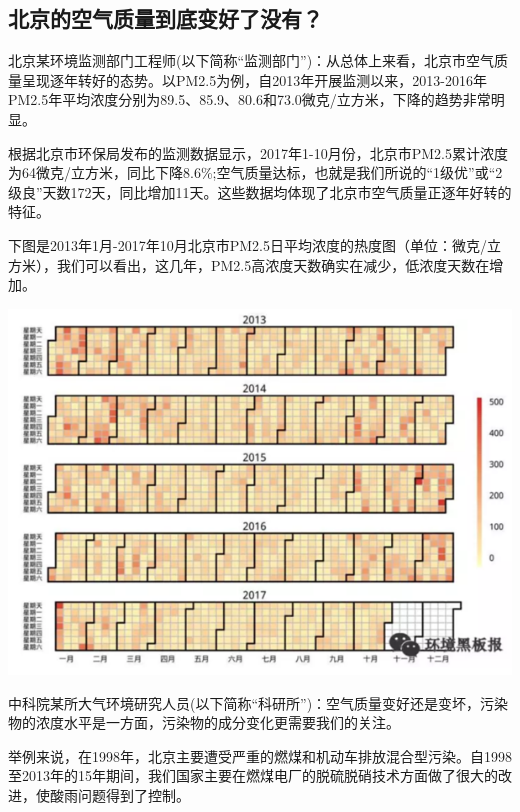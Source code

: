 \documentclass[
]{book}
\begin{document}
\hypertarget{ux5317ux4eacux7684ux7a7aux6c14ux8d28ux91cfux5230ux5e95ux53d8ux597dux4e86ux6ca1ux6709}{%
\subsection{北京的空气质量到底变好了没有？}\label{ux5317ux4eacux7684ux7a7aux6c14ux8d28ux91cfux5230ux5e95ux53d8ux597dux4e86ux6ca1ux6709}}

北京某环境监测部门工程师(以下简称``监测部门'')：从总体上来看，北京市空气质量呈现逐年转好的态势。以PM2.5为例，自2013年开展监测以来，2013-2016年PM2.5年平均浓度分别为89.5、85.9、80.6和73.0微克/立方米，下降的趋势非常明显。

根据北京市环保局发布的监测数据显示，2017年1-10月份，北京市PM2.5累计浓度为64微克/立方米，同比下降8.6\%;空气质量达标，也就是我们所说的``1级优''或``2级良''天数172天，同比增加11天。这些数据均体现了北京市空气质量正逐年好转的特征。

下图是2013年1月-2017年10月北京市PM2.5日平均浓度的热度图（单位：微克/立方米），我们可以看出，这几年，PM2.5高浓度天数确实在减少，低浓度天数在增加。

\includegraphics[width=8.33in]{images/air1}

中科院某所大气环境研究人员(以下简称``科研所'')：空气质量变好还是变坏，污染物的浓度水平是一方面，污染物的成分变化更需要我们的关注。

举例来说，在1998年，北京主要遭受严重的燃煤和机动车排放混合型污染。自1998至2013年的15年期间，我们国家主要在燃煤电厂的脱硫脱硝技术方面做了很大的改进，使酸雨问题得到了控制。
\end{document}
